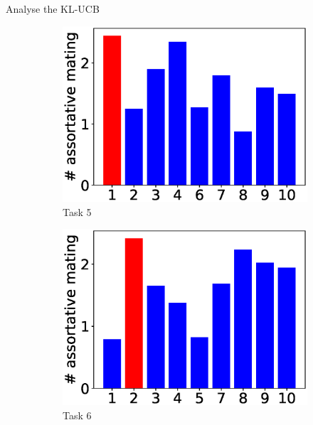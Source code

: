 \begin{frame}{Analyse the KL-UCB}
    \begin{figure}
        \centering
        \begin{subfigure}[b]{0.3\linewidth}
            \centering
            \includegraphics[width=\linewidth]{figure/experiment/bar10/5.eps}
            \caption{Task 5}
            \label{fig:bar10-5}
        \end{subfigure}
        \hfill
        \begin{subfigure}[b]{0.3\linewidth}
            \centering
            \includegraphics[width=\linewidth]{figure/experiment/bar10/6.eps}
            \caption{Task 6}
            \label{fig:bar10-6}
        \end{subfigure}
        \hfill
        \begin{subfigure}[b]{0.3\linewidth}

\end{subfigure}
\end{figure}
\end{frame}
